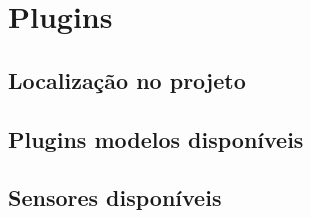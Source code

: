 \chapter{Plugins}


\section{Localização no projeto}

\section{Plugins modelos disponíveis}

\section{Sensores disponíveis}